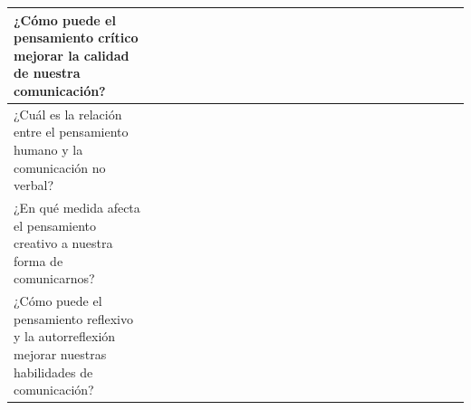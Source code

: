 \documentclass[12pt,a4paper]{article}
\begin{document}
\begin{landscape}
\begin{table}[ht!]
\begin{tabular}{|l|l|l|l|l|l|l|l|l|l|l|l|l|l|l|l|l|l|l|l|l|l|l|l|l|l|}
			¿Cómo puede el pensamiento crítico mejorar la calidad de nuestra comunicación?                         &                                          &    &    &    &    &    &    &    &    &     &     &     &     &     &     &     &     &     &     &     &           \\\hline
			¿Cuál es la relación entre el pensamiento humano y la comunicación no verbal?                          &                                          &    &    &    &    &    &    &    &    &     &     &     &     &     &     &     &     &     &     &     &           \\\hline
			¿En qué medida afecta el pensamiento creativo a nuestra forma de comunicarnos?                         &                                          &    &    &    &    &    &    &    &    &     &     &     &     &     &     &     &     &     &     &     &           \\\hline
			¿Cómo puede el pensamiento reflexivo y la autorreflexión mejorar nuestras habilidades de comunicación? &                                          &    &    &    &    &    &    &    &    &     &     &     &     &     &     &     &     &     &     &     &           \\\hline
		\end{tabular}
	\end{table}
\end{landscape}
\end{document}
